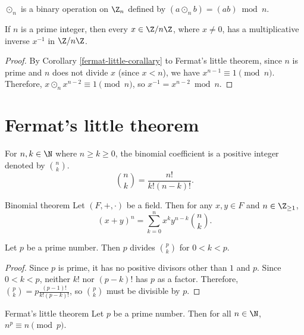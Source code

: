 \documentclass[12pt]{article}
\begin{document}
\begin{defn}
    $\odot_n$ is a binary operation on $\Z_n$ defined by $(a \odot_n b) = (ab)\bmod n$.
\end{defn}

\begin{thm}\label{znz-prime-field}
    If $n$ is a prime integer, then every $x \in \Z/n\Z$, where $x \neq 0$, has a multiplicative inverse $x^{-1}$ in $\Z/n\Z$.
\end{thm}

\begin{proof}
    By Corollary \ref{fermat-little-corallary} to Fermat's little theorem, since $n$ is prime and $n$ does not divide $x$ (since $x < n$), we have $x^{n-1} \equiv 1 \pmod n$. Therefore, $x \odot_n x^{n-2} \equiv 1 \pmod n$, so $x^{-1} = x^{n-2} \bmod n$.
\end{proof}

\section{Fermat's little theorem}

\begin{defn}
    For $n, k \in \N$ where $n \geq k \geq 0$, the binomial coefficient is a positive integer denoted by $n \choose k$. \[{n \choose k} = \frac{n!}{k!(n-k)!}.\]
\end{defn}

\begin{thm}{Binomial theorem}\label{binomial-theorem}\proofbreak
    Let $(F, +, \cdot)$ be a field. Then for any $x, y \in F$ and $n \in \Z_{\geq 1}$, \[\left(x + y\right)^n = \sum_{k=0}^n x^ky^{n-k}{n \choose k}.\]
\end{thm}

\begin{lemma}\label{prime-divisible-combination}
    Let $p$ be a prime number. Then $p$ divides ${p \choose k}$ for $0 < k < p$.
\end{lemma}

\begin{proof}
    Since $p$ is prime, it has no positive divisors other than $1$ and $p$. Since $0 < k < p$, neither $k!$ nor $(p-k)!$ has $p$ as a factor. Therefore, ${p \choose k} = p\frac{(p-1)!}{k!(p-k)!}$, so $p \choose k$ must be divisible by $p$.
\end{proof}

\begin{thm}{Fermat's little theorem}\label{fermat-little-theorem}\proofbreak
    Let $p$ be a prime number. Then for all $n \in \N$, $n^p \equiv n \pmod p$.
\end{thm}
\end{document}
